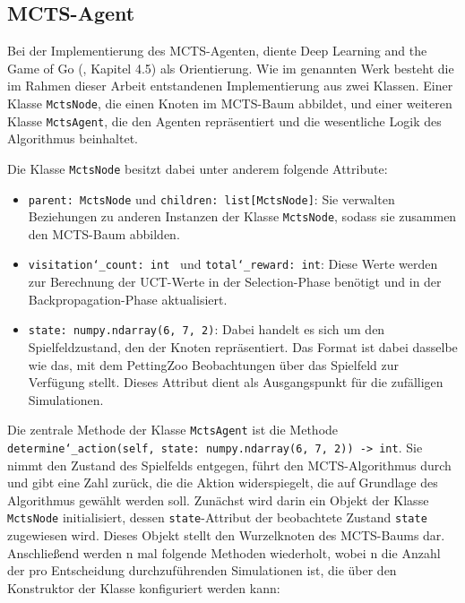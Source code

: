 \subsection{MCTS-Agent}

Bei der Implementierung des MCTS-Agenten, diente \glqq Deep Learning and the Game of Go\grqq{} (\cite{Ferguson.January2019}, Kapitel 4.5) als Orientierung. Wie im genannten Werk besteht die im Rahmen dieser Arbeit entstandenen Implementierung aus zwei Klassen. Einer Klasse \texttt{MctsNode}, die einen Knoten im MCTS-Baum abbildet, und einer weiteren Klasse \texttt{MctsAgent}, die den Agenten repräsentiert und die wesentliche Logik des Algorithmus beinhaltet.

Die Klasse \texttt{MctsNode} besitzt dabei unter anderem folgende Attribute:
\begin{itemize}
\item \texttt{parent: MctsNode} und \texttt{children: list[MctsNode]}: Sie verwalten Beziehungen zu anderen Instanzen der Klasse \texttt{MctsNode}, sodass sie zusammen den MCTS-Baum abbilden.
\item \texttt{visitation\char`_count: int } und \texttt{total\char`_reward: int}: Diese Werte werden zur Berechnung der UCT-Werte in der Selection-Phase benötigt und in der Backpropagation-Phase aktualisiert.
\item \texttt{state: numpy.ndarray(6, 7, 2)}: Dabei handelt es sich um den Spielfeldzustand, den der Knoten repräsentiert. Das Format ist dabei dasselbe wie das, mit dem PettingZoo Beobachtungen über das Spielfeld zur Verfügung stellt. Dieses Attribut dient als Ausgangspunkt für die zufälligen Simulationen.
\end{itemize}

Die zentrale Methode der Klasse \texttt{MctsAgent} ist die Methode \texttt{determine\char`_action(self, state: numpy.ndarray(6, 7, 2)) -> int}. Sie nimmt den Zustand des Spielfelds entgegen, führt den MCTS-Algorithmus durch und gibt eine Zahl zurück, die die Aktion widerspiegelt, die auf Grundlage des Algorithmus gewählt werden soll. Zunächst wird darin ein Objekt der Klasse \texttt{MctsNode} initialisiert, dessen \texttt{state}-Attribut der beobachtete Zustand \texttt{state} zugewiesen wird. Dieses Objekt stellt den Wurzelknoten des MCTS-Baums dar. Anschließend werden n mal folgende Methoden wiederholt, wobei n die Anzahl der pro Entscheidung durchzuführenden Simulationen ist, die über den Konstruktor der Klasse konfiguriert werden kann:

